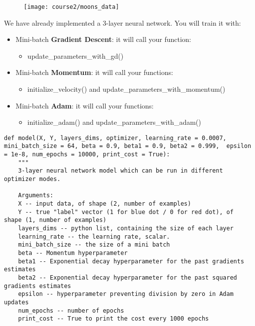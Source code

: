 {\begin{figure}[h]
\begin{center}
\texttt{[image: course2/moons\_data]}
\end{center}
\end{figure}


We have already implemented a 3-layer neural network. You will train it with:
\begin{itemize} 
\item Mini-batch {\textbf{Gradient Descent}}: it will call your function:
    \begin{itemize} 
    \item update\_parameters\_with\_gd()
    \end{itemize} 
\item Mini-batch {\textbf {Momentum}}: it will call your functions:
      \begin{itemize} 
      \item initialize\_velocity() and update\_parameters\_with\_momentum()
      \end{itemize} 
\item Mini-batch {\textbf{Adam}}: it will call your functions:
      \begin{itemize} 
     \item initialize\_adam() and update\_parameters\_with\_adam()
      \end{itemize} 
\end{itemize} 

\begin{verbatim}
def model(X, Y, layers_dims, optimizer, learning_rate = 0.0007, mini_batch_size = 64, beta = 0.9, beta1 = 0.9, beta2 = 0.999,  epsilon = 1e-8, num_epochs = 10000, print_cost = True):
    """
    3-layer neural network model which can be run in different optimizer modes.
    
    Arguments:
    X -- input data, of shape (2, number of examples)
    Y -- true "label" vector (1 for blue dot / 0 for red dot), of shape (1, number of examples)
    layers_dims -- python list, containing the size of each layer
    learning_rate -- the learning rate, scalar.
    mini_batch_size -- the size of a mini batch
    beta -- Momentum hyperparameter
    beta1 -- Exponential decay hyperparameter for the past gradients estimates 
    beta2 -- Exponential decay hyperparameter for the past squared gradients estimates 
    epsilon -- hyperparameter preventing division by zero in Adam updates
    num_epochs -- number of epochs
    print_cost -- True to print the cost every 1000 epochs


\end{verbatim}}
